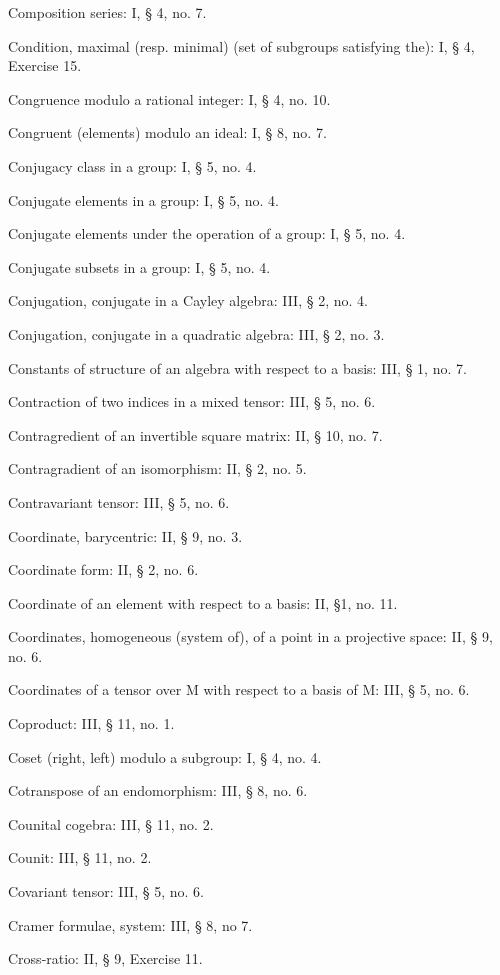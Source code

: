 Composition series: I, § 4, no. 7.

Condition, maximal (resp. minimal) (set of subgroups satisfying the): I, § 4, Exercise 15.

Congruence modulo a rational integer: I, § 4, no. 10.

Congruent (elements) modulo an ideal: I, § 8, no. 7.

Conjugacy class in a group: I, § 5, no. 4.

Conjugate elements in a group: I, § 5, no. 4.

Conjugate elements under the operation of a group: I, § 5, no. 4.

Conjugate subsets in a group: I, § 5, no. 4.

Conjugation, conjugate in a Cayley algebra: III, § 2, no. 4.

Conjugation, conjugate in a quadratic algebra: III, § 2, no. 3.

Constants of structure of an algebra with respect to a basis: III, § 1, no. 7.

Contraction of two indices in a mixed tensor: III, § 5, no. 6.

Contragredient of an invertible square matrix: II, § 10, no. 7.

Contragradient of an isomorphism: II, § 2, no. 5.

Contravariant tensor: III, § 5, no. 6.

Coordinate, barycentric: II, § 9, no. 3.

Coordinate form: II, § 2, no. 6.

Coordinate of an element with respect to a basis: II, §1, no. 11.

Coordinates, homogeneous (system of), of a point in a projective space: II, § 9, no. 6.

Coordinates of a tensor over M with respect to a basis of M: III, § 5, no. 6.

Coproduct: III, § 11, no. 1.

Coset (right, left) modulo a subgroup: I, § 4, no. 4.

Cotranspose of an endomorphism: III, § 8, no. 6.

Counital cogebra: III, § 11, no. 2.

Counit: III, § 11, no. 2.

Covariant tensor: III, § 5, no. 6.

Cramer formulae, system: III, § 8, no 7.

Cross-ratio: II, § 9, Exercise 11.

